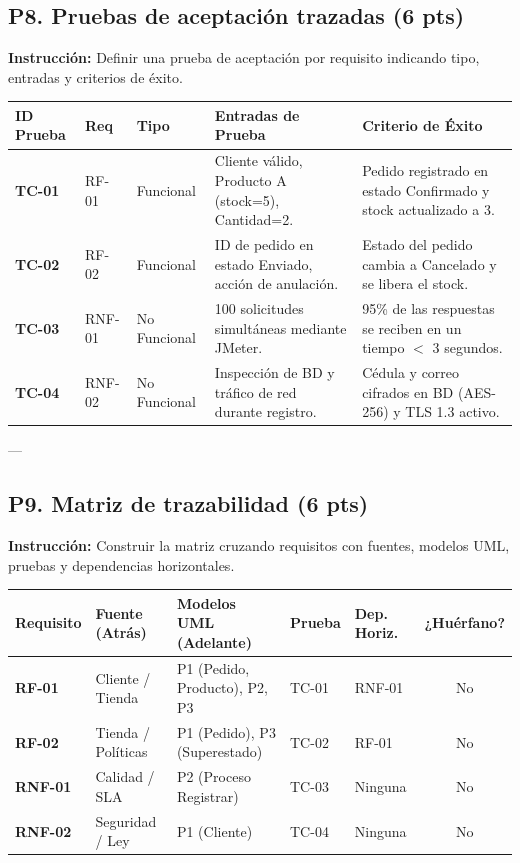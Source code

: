 \documentclass[12pt,a4paper]{article}
\begin{document}
\newpage

\subsection*{P8. Pruebas de aceptación trazadas (6 pts)}
\textbf{Instrucción:} Definir una prueba de aceptación por requisito indicando tipo, entradas y criterios de éxito.

\begin{table}[H]
\centering
\small
\begin{tabularx}{\textwidth}{|l|l|l|X|X|}
\hline
\textbf{ID Prueba} & \textbf{Req} & \textbf{Tipo} & \textbf{Entradas de Prueba} & \textbf{Criterio de Éxito} \\
\hline
\textbf{TC-01} & RF-01 & Funcional & Cliente válido, Producto A (stock=5), Cantidad=2. & Pedido registrado en estado Confirmado y stock actualizado a 3. \\
\hline
\textbf{TC-02} & RF-02 & Funcional & ID de pedido en estado Enviado, acción de anulación. & Estado del pedido cambia a Cancelado y se libera el stock. \\
\hline
\textbf{TC-03} & RNF-01 & No Funcional & 100 solicitudes simultáneas mediante JMeter. & 95\% de las respuestas se reciben en un tiempo $<$ 3 segundos. \\
\hline
\textbf{TC-04} & RNF-02 & No Funcional & Inspección de BD y tráfico de red durante registro. & Cédula y correo cifrados en BD (AES-256) y TLS 1.3 activo. \\
\hline
\end{tabularx}
\end{table}

---

\subsection*{P9. Matriz de trazabilidad (6 pts)}
\textbf{Instrucción:} Construir la matriz cruzando requisitos con fuentes, modelos UML, pruebas y dependencias horizontales.

\begin{table}[H]
\centering
\small
\begin{tabularx}{\textwidth}{|l|X|X|l|l|c|}
\hline
\textbf{Requisito} & \textbf{Fuente (Atrás)} & \textbf{Modelos UML (Adelante)} & \textbf{Prueba} & \textbf{Dep. Horiz.} & \textbf{¿Huérfano?} \\
\hline
\textbf{RF-01} & Cliente / Tienda & P1 (Pedido, Producto), P2, P3 & TC-01 & RNF-01 & No \\
\hline
\textbf{RF-02} & Tienda / Políticas & P1 (Pedido), P3 (Superestado) & TC-02 & RF-01 & No \\
\hline
\textbf{RNF-01} & Calidad / SLA & P2 (Proceso Registrar) & TC-03 & Ninguna & No \\
\hline
\textbf{RNF-02} & Seguridad / Ley & P1 (Cliente) & TC-04 & Ninguna & No \\
\hline
\end{tabularx}
\end{table}
\end{document}
